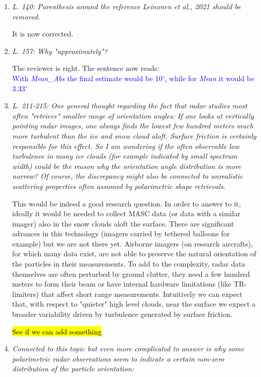 \documentclass[12pt]{article}
\newcommand*{\blue}{\textcolor{blue}}
\begin{document}
\begin{enumerate}
    \item \textit{L. 140: Parenthesis around the reference Leinonen et al., 2021 should be removed.}
    
    \noindent
    It is now corrected.\\

    \item \textit{L. 157: Why "approximately"?}

    \noindent
    The reviewer is right. The sentence now reads:\\
    \blue{With \textit{Mean\_Abs} the final estimate would be 10$^\circ$, while for \textit{Mean} it would be 3.33$^\circ$}\\


    \item \textit{L. 211-215: One general thought regarding the fact that radar studies most often "retrieve" smaller range of orientation angles: If one looks at vertically pointing radar images, one always finds the lowest few hundred meters much more turbulent than the ice and snow cloud aloft. Surface friction is certainly responsible for this effect. So I am wondering if the often observable low turbulence in many ice clouds (for example indicated by small spectrum width) could be the reason why the orientation angle distribution is more narrow? Of course, the discrepancy might also be connected to unrealistic scattering properties often assumed by polarimetric shape retrievals.}

    This would be indeed a good research question. In order to answer to it, ideally it would be needed to collect MASC data (or data with a similar imager) also in the snow clouds aloft the surface. There are significant advances in this technology (imagers carried by tethered balloons for example) but we are not there yet. Airborne imagers (on research aircrafts), for which many data exist, are not able to preserve the natural orientation of the particles in their measurements. To add to the complexity, radar data themselves are often perturbed by ground clutter, they need a few hundred meters to form their beam or have internal hardware limitations (like TR-limiters) that affect short range measurements. Intuitively we can expect that, with respect to "quieter" high level clouds, near the surface we expect a broader variability driven by turbulence generated by surface friction.  
    
    \hl{See if we can add something}

    \item \textit{Connected to this topic but even more complicated to answer is why some polarimetric radar observations seem to indicate a certain non-zero distribution of the particle orientation: \cite{Melnikov_JAOT_2013}}


\end{enumerate}
\end{document}
